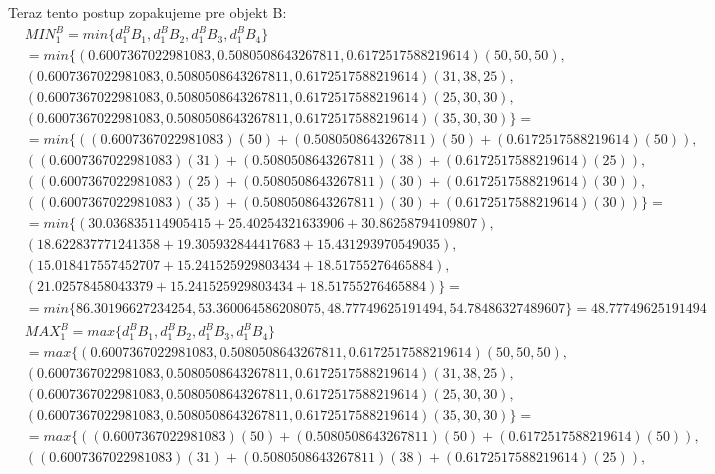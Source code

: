 \documentclass[a4paper]{article}
\begin{document}
	Teraz tento postup zopakujeme pre objekt B:
	\begin{align*}
		&MIN_1^B = min\{d_1^B B_1, d_1^B B_2, d_1^B B_3, d_1^B B_4\} 
		\\
		&= min\{
		(0.6007367022981083, 0.5080508643267811, 0.6172517588219614) (50, 50, 50), 
		\\&(0.6007367022981083, 0.5080508643267811, 0.6172517588219614) (31, 38, 25), 
		\\&(0.6007367022981083, 0.5080508643267811, 0.6172517588219614) (25, 30, 30), 
		\\&(0.6007367022981083, 0.5080508643267811, 0.6172517588219614) (35, 30, 30)\}=
		\\
		&= min\{
		((0.6007367022981083)(50) + (0.5080508643267811)(50) + (0.6172517588219614)(50)), 
		\\&((0.6007367022981083)(31) + (0.5080508643267811)(38) + (0.6172517588219614)(25)), 
		\\&((0.6007367022981083)(25) + (0.5080508643267811)(30) + (0.6172517588219614)(30)), 
		\\&((0.6007367022981083)(35) + (0.5080508643267811)(30) + (0.6172517588219614)(30))\}=
		\\
		&=min\{
		(30.036835114905415 + 25.40254321633906 + 30.86258794109807), 
		\\&(18.622837771241358 + 19.305932844417683 + 15.431293970549035), 
		\\&(15.018417557452707+ 15.241525929803434 + 18.51755276465884), 
		\\&(21.02578458043379 + 15.241525929803434 + 18.51755276465884)\}=
		\\&=min\{
		86.30196627234254, 
		53.360064586208075, 
		48.77749625191494, 
		54.78486327489607\} = 48.77749625191494
		\\
		&MAX_1^B = max\{d_1^B B_1, d_1^B B_2, d_1^B B_3, d_1^B B_4\} 
		\\
		&= max\{
		(0.6007367022981083, 0.5080508643267811, 0.6172517588219614) (50, 50, 50), 
		\\&(0.6007367022981083, 0.5080508643267811, 0.6172517588219614) (31, 38, 25), 
		\\&(0.6007367022981083, 0.5080508643267811, 0.6172517588219614) (25, 30, 30), 
		\\&(0.6007367022981083, 0.5080508643267811, 0.6172517588219614) (35, 30, 30)\}=
		\\
		&= max\{
		((0.6007367022981083)(50) + (0.5080508643267811)(50) + (0.6172517588219614)(50)), 
		\\&((0.6007367022981083)(31) + (0.5080508643267811)(38) + (0.6172517588219614)(25)), 

\end{align*}
\end{document}
